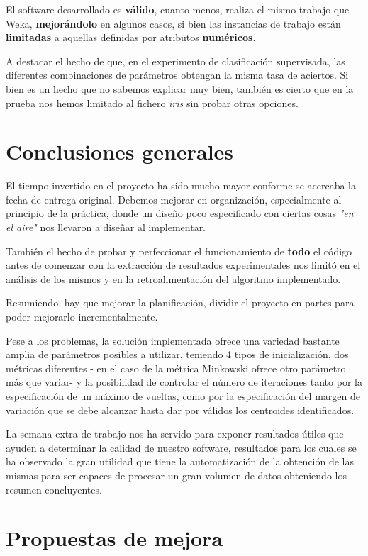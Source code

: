 \documentclass[a4paper]{report}
\begin{document}
El software desarrollado es \textbf{válido}, cuanto menos, realiza el mismo trabajo que Weka, \textbf{mejorándolo} en algunos casos, si bien las instancias de trabajo están \textbf{limitadas} a aquellas definidas por atributos \textbf{numéricos}.

A destacar el hecho de que, en el experimento de clasificación supervisada, las diferentes combinaciones de parámetros obtengan la misma tasa de aciertos. Si bien es un hecho que no sabemos explicar muy bien, también es cierto que en la prueba nos hemos limitado al fichero \textit{iris} sin probar otras opciones.

\section{Conclusiones generales}

El tiempo invertido en el proyecto ha sido mucho mayor conforme se acercaba la fecha de entrega original. Debemos mejorar en organización, especialmente al principio de la práctica, donde un diseño poco especificado con ciertas cosas \textit{"en el aire"} nos llevaron a diseñar al implementar.

También el hecho de probar y perfeccionar el funcionamiento de \textbf{todo} el código antes de comenzar con la extracción de resultados experimentales nos limitó en el análisis de los mismos y en la retroalimentación del algoritmo implementado.

Resumiendo, hay que mejorar la planificación, dividir el proyecto en partes para poder mejorarlo incrementalmente.

Pese a los problemas, la solución implementada ofrece una variedad bastante amplia de parámetros posibles a utilizar, teniendo 4 tipos de inicialización, dos métricas diferentes - en el caso de la métrica Minkowski ofrece otro parámetro más que variar- y la posibilidad de controlar el número de iteraciones tanto por la especificación de un máximo de vueltas, como por la especificación del margen de variación que se debe alcanzar hasta dar por válidos los centroides identificados.

La semana extra de trabajo nos ha servido para exponer resultados útiles que ayuden a determinar la calidad de nuestro software, resultados para los cuales se ha observado la gran utilidad que tiene la automatización de la obtención de las mismas para ser capaces de procesar un gran volumen de datos obteniendo los resumen concluyentes.

\section{Propuestas de mejora}
\end{document}
